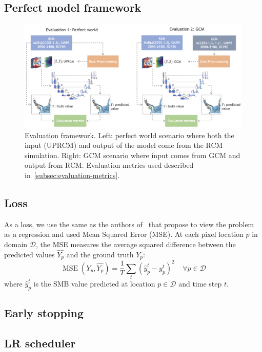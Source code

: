 \documentclass[a4paper,11pt,oneside]{report}
\begin{document}
\subsection{Perfect model framework}\label{subsec:perfect-model-training}
\begin{figure}[!t]
  \centering
  \includegraphics[width=\columnwidth]{images/evaluation_framework.png}
  \caption []{\small Evaluation framework. Left: perfect world scenario where both the input (UPRCM) and output of the model come from the RCM simulation. Right: GCM scenario where input comes from GCM and output from RCM. Evaluation metrics used described in~\ref{subsec:evaluation-metrics}.}
  \vspace{-3mm}
  \label{fig:evaluation-framework}
\end{figure}


\subsection{Loss}\label{subsec:loss}
As a loss, we use the same as the authors of~\cite{Doury} that propose to view the problem as a regression and used Mean Squared Error (MSE). At each pixel location $p$ in domain $\mathcal{D}$, the MSE measures the average squared difference between the predicted values $\widehat{Y_{p}}$ and the ground truth $Y_{p}$:
\begin{equation}
        \operatorname{MSE}\left(Y_{p},\widehat{Y_{p}}\right) = \frac{1}{T}\sum_{t}(\hat{y}_{p}^{t}-y^{t}_{p})^2   \;\;\;\; \forall p \in \mathcal{D} 
\end{equation}
where $\hat{y}_{p}^{t}$ is the SMB value predicted at location $p\in \mathcal{D} $ and time step $t$.

\subsection{Early stopping}
\subsection{LR scheduler}
\end{document}
